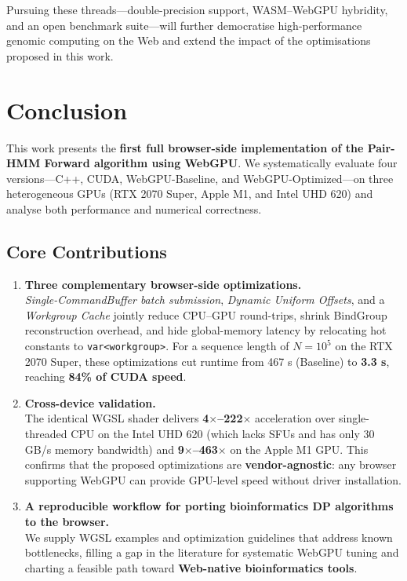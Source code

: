 \documentclass[PhD]{PHlab-thesis}
\begin{document}
Pursuing these threads—double-precision support, WASM–WebGPU hybridity, and an open benchmark suite—will further democratise high-performance genomic computing on the Web and extend the impact of the optimisations proposed in this work.

\chapter{Conclusion}
This work presents the \textbf{first full browser-side implementation of the Pair-HMM Forward algorithm using WebGPU}. We systematically evaluate four versions—C++, CUDA, WebGPU-Baseline, and WebGPU-Optimized—on three heterogeneous GPUs (RTX 2070 Super, Apple M1, and Intel UHD 620) and analyse both performance and numerical correctness.

\section{Core Contributions}
\begin{enumerate}
    \item \textbf{Three complementary browser-side optimizations.} \\
    \emph{Single-CommandBuffer batch submission}, \emph{Dynamic Uniform Offsets}, and a \emph{Workgroup Cache} jointly reduce CPU–GPU round-trips, shrink BindGroup reconstruction overhead, and hide global-memory latency by relocating hot constants to \texttt{var<workgroup>}. For a sequence length of $N=10^5$ on the RTX 2070 Super, these optimizations cut runtime from 467 s (Baseline) to \textbf{3.3 s}, reaching \textbf{84\% of CUDA speed}.
    \item \textbf{Cross-device validation.} \\
    The identical WGSL shader delivers \textbf{4$\times$–222$\times$} acceleration over single-threaded CPU on the Intel UHD 620 (which lacks SFUs and has only 30 GB/s memory bandwidth) and \textbf{9$\times$–463$\times$} on the Apple M1 GPU. This confirms that the proposed optimizations are \textbf{vendor-agnostic}: any browser supporting WebGPU can provide GPU-level speed without driver installation.
    \item \textbf{A reproducible workflow for porting bioinformatics DP algorithms to the browser.} \\
    We supply WGSL examples and optimization guidelines that address known bottlenecks, filling a gap in the literature for systematic WebGPU tuning and charting a feasible path toward \textbf{Web-native bioinformatics tools}.
\end{enumerate}
\end{document}
